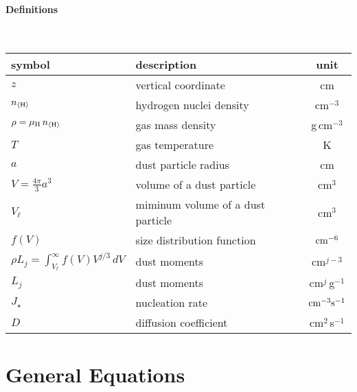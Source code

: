 \documentclass[11pt]{article}
\def\nH{n_{\langle\rm H\rangle}}
\def\Vl{V_{\ell}}
\begin{document}
\paragraph{Definitions}{\ }\\

\begin{tabular}{l|l|c}
\hline
symbol  & description & unit\\
\hline
$z$                       & vertical coordinate    & cm\\
$\nH$                     & hydrogen nuclei density & cm$^{-3}$\\
$\rho = \mu_{\rm H}\,\nH$  & gas mass density       & g\,cm$^{-3}$\\
$T$                       & gas temperature        & K\\
$a$                       & dust particle radius   & cm\\
$V=\frac{4\pi}{3}a^3$     & volume of a dust particle & cm$^3$\\
$\Vl$                     & miminum volume of a dust particle & cm$^3$\\
$f(V)$                    & size distribution function & $\rm cm^{-6}$\\
$\rho L_j=\int_{V_\ell}^\infty f(V)V^{j/3}\,dV$  
                          & dust moments           & cm$^{j-3}$\\
$L_j$                     & dust moments           & cm$^j$\,g$^{-1}$\\
$J_\star$                  & nucleation rate        & $\rm cm^{-3}s^{-1}$\\
$D$                       & diffusion coefficient  & cm$^2$\,s$^{-1}$\\
\hline  
\end{tabular}

\bigskip
\section{General Equations}
\end{document}
